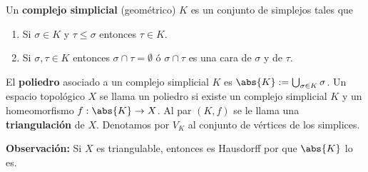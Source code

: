 \documentclass{article}
\begin{document}
\vspace{2mm}
\begin{dfn}
    Un \textbf{complejo simplicial} (geométrico) $K$ es un conjunto de simplejos tales que
    \begin{enumerate}
        \item Si $\sigma\in K$ y $\tau\leq\sigma$ entonces $\tau\in K$.
        \item Si $\sigma,\tau\in K$ entonces $\sigma\cap\tau=\emptyset$ ó $\sigma\cap\tau$ es una
        cara de $\sigma$ y de $\tau$.
    \end{enumerate}
\end{dfn}
\noindent El \textbf{poliedro} asociado a un complejo simplicial $K$ es 
$\abs{K}:=\bigcup_{\sigma\in K}\sigma$. Un espacio topológico $X$ se llama un poliedro si existe
un complejo simplicial $K$ y un homeomorfismo $f:\abs{K}\to X$. Al par $(K,f)$ se le llama una 
\textbf{triangulación} de $X$. Denotamos por $V_{K}$ al conjunto de vértices de los simplices.

\vspace{2mm}
\noindent\textbf{Observación:} Si $X$ es triangulable, entonces es Hausdorff por que $\abs{K}$ 
lo es.
\end{document}
